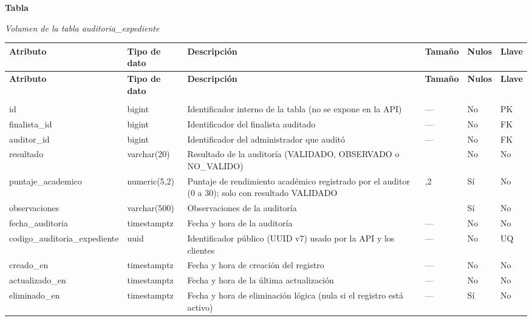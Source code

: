 \label{tab:volumen_auditoria_expediente}
\noindent\textbf{Tabla~\thetable}\par\nopagebreak
\noindent\textit{Volumen de la tabla auditoria\_\allowbreak{}expediente}\par\nopagebreak
\begingroup\small\linespread{1}\selectfont\setlength{\tabcolsep}{4pt}
\begin{longtable}{>{\raggedright\arraybackslash}p{3.4cm} >{\raggedright\arraybackslash}p{2.5cm} >{\raggedright\arraybackslash}p{4.8cm} >{\centering\arraybackslash}p{1.6cm}>{\centering\arraybackslash}p{1.1cm} >{\centering\arraybackslash}p{1.3cm}}
\toprule
\textbf{Atributo} & \textbf{Tipo de dato} & \textbf{Descripción} & \textbf{Tamaño} & \textbf{Nulos} & \textbf{Llave} \\
\midrule
\endfirsthead
\toprule
\textbf{Atributo} & \textbf{Tipo de dato} & \textbf{Descripción} & \textbf{Tamaño} & \textbf{Nulos} & \textbf{Llave} \\
\midrule
\endhead
\endfoot
\bottomrule
\multicolumn{6}{l}{\textit{Nota.} Elaboración propia.} \\
\endlastfoot
id & bigint & Identificador interno de la tabla (no se expone en la API) & — & No & PK \\
finalista\_\allowbreak{}id & bigint & Identificador del finalista auditado & — & No & FK \\
auditor\_\allowbreak{}id & bigint & Identificador del administrador que auditó & — & No & FK \\
resultado & varchar(20) & Resultado de la auditoría (VALIDADO, OBSERVADO o NO\_\allowbreak{}VALIDO) & 20 & No & No \\
puntaje\_\allowbreak{}academico & numeric(5,2) & Puntaje de rendimiento académico registrado por el auditor (0 a 30); solo con resultado VALIDADO & 5,2 & Sí & No \\
observaciones & varchar(500) & Observaciones de la auditoría & 500 & Sí & No \\
fecha\_\allowbreak{}auditoria & timestamptz & Fecha y hora de la auditoría & — & No & No \\
codigo\_\allowbreak{}auditoria\_\allowbreak{}expediente & uuid & Identificador público (UUID v7) usado por la API y los clientes & — & No & UQ \\
creado\_\allowbreak{}en & timestamptz & Fecha y hora de creación del registro & — & No & No \\
actualizado\_\allowbreak{}en & timestamptz & Fecha y hora de la última actualización & — & No & No \\
eliminado\_\allowbreak{}en & timestamptz & Fecha y hora de eliminación lógica (nula si el registro está activo) & — & Sí & No \\
\end{longtable}
\endgroup
\addtocounter{table}{-1}

